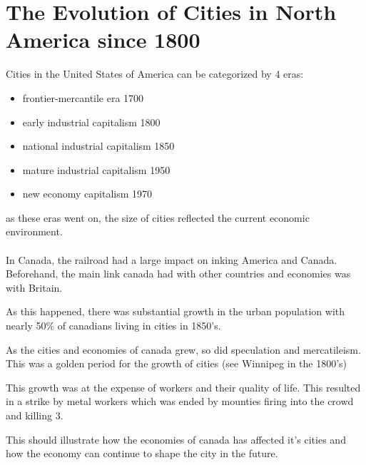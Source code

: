 \documentclass[12pt]{book}
\begin{document}
\section*{The Evolution of Cities in North America since 1800}
Cities in the United States of America can be categorized by 4 eras:
\begin{itemize}
        \item frontier-mercantile era 1700
        \item early industrial capitalism 1800
        \item national industrial capitalism 1850
        \item mature industrial capitalism 1950
        \item new economy capitalism 1970
\end{itemize}
as these eras went on, the size of cities reflected the current economic environment.

\paragraph{}
In Canada, the railroad had a large impact on inking America and Canada. Beforehand, the main link canada
had with other countries and economies was with Britain.

As this happened, there was substantial growth in the urban population with nearly 50\% of canadians living in cities
in 1850's.

As the cities and economies of canada grew, so did speculation and mercatileism. This was a golden period for 
the growth of cities (see Winnipeg in the 1800's)

This growth was at the expense of workers and their quality of life. This resulted in a strike by metal workers 
which was ended by mounties firing into the crowd and killing 3.

This should illustrate how the economies of canada has affected it's cities and how the economy can continue to 
shape the city in the future.
\end{document}
